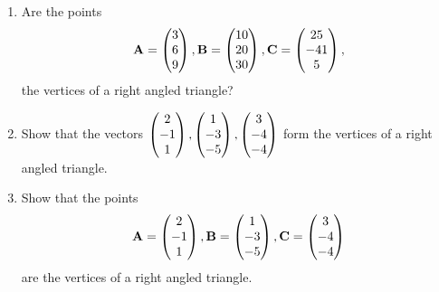 \documentclass[journal,12pt,twocolumn]{IEEEtran}
\renewcommand\thesection{\arabic{section}}
\begin{document}
\begin{enumerate}[label=\thesection.\arabic*.,ref=\thesection.\theenumi]
\\
\solution
%
\item Are the points 
\begin{align}
\mathbf{A} = \begin{pmatrix}3\\6 \\9\end{pmatrix},
\mathbf{B} = \begin{pmatrix}10\\20 \\30\end{pmatrix},
\mathbf{C} = \begin{pmatrix}25\\ -41\\5\end{pmatrix},
\end{align}
%
the vertices of a right angled triangle?
\\
\solution
%
\item Show that the vectors 
$
\begin{pmatrix}2\\-1 \\1\end{pmatrix},
\begin{pmatrix}1\\-3 \\-5\end{pmatrix},
\begin{pmatrix}3\\ -4\\-4\end{pmatrix}
$
form the vertices of a right angled triangle.
\\
\solution
%
\item Show that the points 
\begin{align}
\mathbf{A} = \begin{pmatrix}2\\-1 \\1\end{pmatrix},
\mathbf{B} = \begin{pmatrix}1\\-3 \\-5\end{pmatrix},
\mathbf{C} = \begin{pmatrix}3\\ -4\\-4\end{pmatrix}
\end{align}
%
are the vertices of a right angled triangle.
\\
\solution
%



\end{enumerate}
\end{document}
